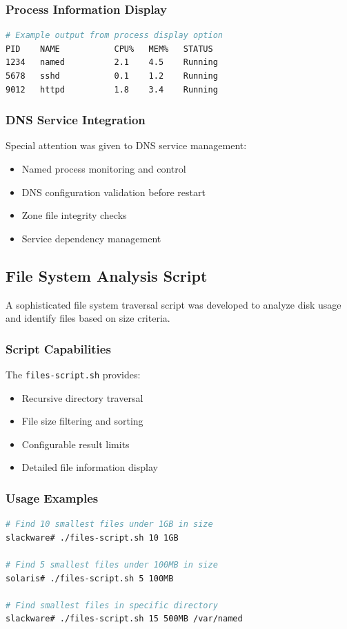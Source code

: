 \documentclass[12pt,a4paper]{article}
\begin{document}
\subsubsection{Process Information Display}
\begin{lstlisting}[language=bash, caption=Process Information Example]
# Example output from process display option
PID    NAME           CPU%   MEM%   STATUS
1234   named          2.1    4.5    Running
5678   sshd           0.1    1.2    Running
9012   httpd          1.8    3.4    Running
\end{lstlisting}

\subsubsection{DNS Service Integration}
Special attention was given to DNS service management:
\begin{itemize}
    \item Named process monitoring and control
    \item DNS configuration validation before restart
    \item Zone file integrity checks
    \item Service dependency management
\end{itemize}

\subsection{File System Analysis Script}\label{subsec:filesystem-analysis}

A sophisticated file system traversal script was developed to analyze disk usage and identify files based on size criteria.

\subsubsection{Script Capabilities}
The \texttt{files-script.sh} provides:
\begin{itemize}
    \item Recursive directory traversal
    \item File size filtering and sorting
    \item Configurable result limits
    \item Detailed file information display
\end{itemize}

\subsubsection{Usage Examples}
\begin{lstlisting}[language=bash, caption=File System Analysis Usage]
# Find 10 smallest files under 1GB in size
slackware# ./files-script.sh 10 1GB

# Find 5 smallest files under 100MB in size
solaris# ./files-script.sh 5 100MB

# Find smallest files in specific directory
slackware# ./files-script.sh 15 500MB /var/named
\end{lstlisting}
\end{document}
